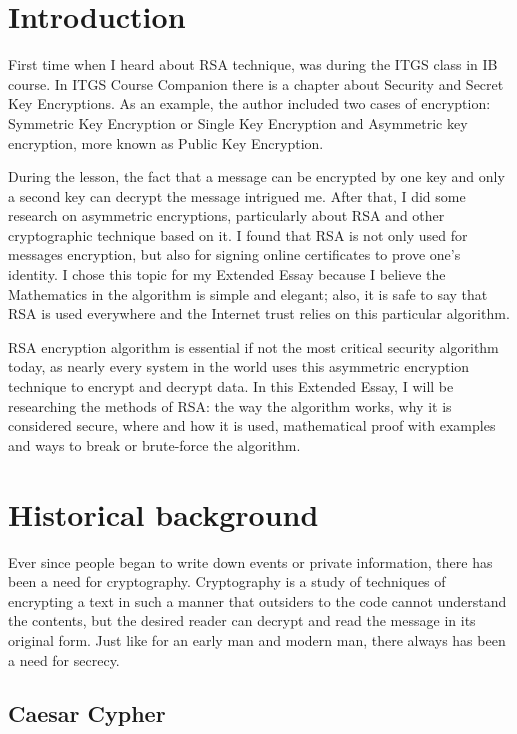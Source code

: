 \documentclass[a4paper, 12pt]{article}
\begin{document}
\section{Introduction}
\label{sec:introduction}

First time when I heard about RSA technique, was during the ITGS class in IB course. In ITGS
Course Companion\cite{itgs} there is a
chapter about Security and Secret Key Encryptions. As an example, the author included two cases
of encryption: Symmetric Key Encryption or Single Key Encryption and Asymmetric key
encryption, more known as Public Key Encryption.

During the lesson, the fact that a message can be encrypted by one key and only a second key can
decrypt the message intrigued me. After that, I did some research on asymmetric encryptions,
particularly about RSA and other cryptographic technique based on it. I found that RSA is not only
used for messages encryption, but also for signing online certificates to prove one's identity. I
chose this topic for my Extended Essay because I believe the Mathematics in the algorithm is
simple and elegant; also, it is safe to say that RSA is used everywhere and the Internet trust relies
on this particular algorithm.

RSA encryption algorithm is essential if not the most critical security algorithm today, as nearly
every system in the world uses this asymmetric encryption technique to encrypt and decrypt data.
In this Extended Essay, I will be researching the methods of RSA: the way the algorithm works,
why it is considered secure, where and how it is used, mathematical proof with examples and ways
to break or brute-force the algorithm.

\section{Historical background}
\label{bsec:historical_background}

Ever since people began to write down events or private information, there has been a need for
cryptography. Cryptography is a study of techniques of encrypting a text in such a manner that
outsiders to the code cannot understand the contents, but the desired reader can decrypt and read
the message in its original form. Just like for an early man and modern man, there always has been a
need for secrecy. 

\subsection{Caesar Cypher}
\label{bsec:caesar_cypher}
\end{document}
